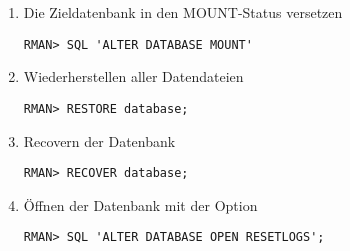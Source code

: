 \begin{enumerate}
\begin{merke}
              \end{merke}
            \item Die Zieldatenbank in den MOUNT-Status versetzen
              \begin{lstlisting}[caption={Zieldatenbank
              mounten},label=admin1520,language=rman,emph={[9]ALTER,DATABASE,MOUNT},emphstyle={[9]\color{magenta}\bfseries}]
RMAN> SQL 'ALTER DATABASE MOUNT'
              \end{lstlisting}
\clearpage
            \item Wiederherstellen aller Datendateien
              \begin{lstlisting}[caption={Datendateien wiederherstellen},label=admin1521,language=rman]
RMAN> RESTORE database;
              \end{lstlisting}
            \item Recovern der Datenbank
              \begin{lstlisting}[caption={Recovern der Datenbank},label=admin1522,language=rman]
RMAN> RECOVER database;
              \end{lstlisting}
            \item Öffnen der Datenbank mit der Option 
              \begin{lstlisting}[caption={Datenbank mit open resetlogs öffnen},label=admin1523,language=rman,emph={[9]ALTER,DATABASE,OPEN,RESETLOGS},emphstyle={[9]\color{magenta}\bfseries}]
RMAN> SQL 'ALTER DATABASE OPEN RESETLOGS';
              \end{lstlisting}
            \end{enumerate}
